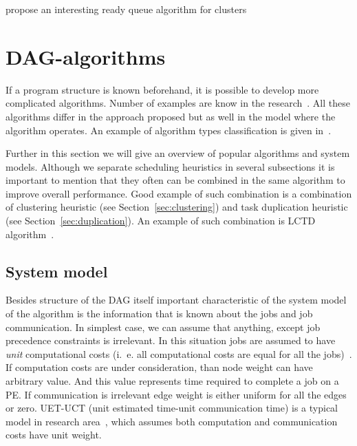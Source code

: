 \cite{zaharia2010delay} propose an interesting ready queue algorithm for clusters

\section{DAG-algorithms}
\label{sec:dag_algs}

If a program structure is known beforehand, it is possible to develop
more complicated algorithms. Number of examples are know in the
research~\cite{wu1990hypertool,bittencourt2010dag,wu2000mcp,adam1974,kwok1999static,zheng20131673,Topcuoglu2002}. All
these algorithms differ in the approach proposed but as well in the
model where the algorithm operates. An example of algorithm types
classification is given in~\cite{kwok1999static}.

Further in this section we will give an overview of popular algorithms
and system models. Although we separate scheduling heuristics in
several subsections it is important to mention that they often can be
combined in the same algorithm to improve overall performance. Good
example of such combination is a combination of clustering heuristic
(see Section~\ref{sec:clustering}) and task duplication heuristic (see
Section~\ref{sec:duplication}). An example of such combination is LCTD
algorithm~\cite{chen1993performance}. 

\subsection{System model}
\label{sec:model}

Besides structure of the DAG itself important characteristic of the
system model of the algorithm is the information that is known about
the jobs and job communication. In simplest case, we can assume that
anything, except job precedence constraints is irrelevant. In this
situation jobs are assumed to have \emph{unit} computational costs
(i.~e. all computational costs are equal for all the
jobs)~\cite{Hu1961,adam1974}. If computation costs are under
consideration, than node weight can have arbitrary value. And this
value represents time required to complete a job on a PE. If
communication is irrelevant edge weight is either uniform for all the
edges or zero. UET-UCT (unit estimated time-unit communication time)
is a typical model in research area~\cite{finta1996scheduling,
  andronikos2000optimal}, which assumes both computation and
communication costs have unit weight.

